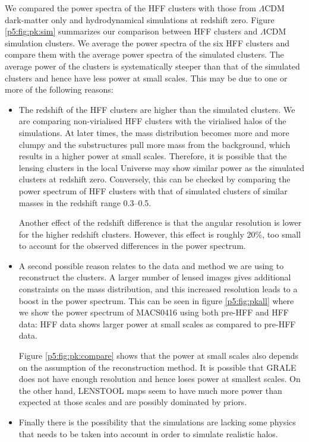 \documentclass[
  11pt,
  twoside,
  openright,
  titlepage,
  headings=optiontoheadandtoc
]{scrbook}
\begin{document}
We compared the power spectra of the HFF clusters with those from $\Lambda$CDM
dark-matter only and hydrodynamical simulations at redshift zero.
Figure \ref{p5:fig:pk:sim} summarizes our comparison between HFF clusters and
$\Lambda$CDM simulation clusters. We average the power spectra of the six HFF
clusters and compare them with the average power spectra of the simulated
clusters. The average power of the clusters is systematically steeper than
that of the simulated clusters and hence have less power at small
scales. This may be due to one or more of the following reasons:

\begin{itemize}
    \item The redshift of the HFF clusters are higher than the simulated clusters.
    We are comparing non-virialised HFF clusters with the virialised
    halos of the simulations. At later times, the mass distribution
    becomes more and more clumpy and the substructures pull
    more mass from the background,
    which results in a higher power at small scales. Therefore, it
    is possible that the lensing clusters in the local Universe may
    show similar power as the simulated clusters
    at redshift zero. Conversely, this can be checked by comparing
    the power spectrum of HFF clusters with that of simulated clusters of similar masses
    in the redshift range 0.3--0.5.

    Another effect of the redshift difference is that the angular resolution is lower for the higher redshift clusters. However, this effect is roughly 20$\%$, too small to account for the observed differences in the power spectrum.

    \item A second possible reason relates to the data and method we are
    using to reconstruct the clusters. A larger number of lensed images gives
    additional constraints on the mass distribution, and this increased resolution leads to a boost
    in the power spectrum. This can be seen in figure \ref{p5:fig:pkall}  where we show the power
    spectrum of MACS0416 using both pre-HFF and HFF data: HFF data shows
    larger power at small scales as compared to pre-HFF data.

    Figure \ref{p5:fig:pk:compare} shows that the power at small scales
    also depends on the assumption of the reconstruction method.
    It is possible that GRALE does not have enough resolution  and hence loses
    power at smallest scales. On the other hand, LENSTOOL maps seem to have
    much more power than expected at those scales and are possibly dominated by priors.

    \item Finally there is the possibility that the simulations are lacking
    some physics that needs to be taken into account in order to simulate
    realistic halos.
\end{itemize}
\end{document}

